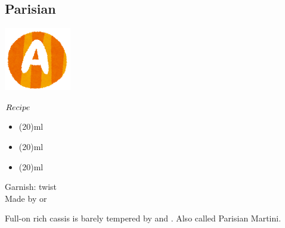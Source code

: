 \subsection{Parisian}
\vspace{-7mm}
\hspace{28mm}
\includegraphics[scale=.12]{capital_a.png}
\vspace{2.5mm}
\begin{itembox}[l]{\boldmath $Recipe$}
\begin{itemize}
\setlength{\parskip}{0cm}
\setlength{\itemsep}{0cm}
\item {}(20)ml
\item {}(20)ml
\item {}(20)ml
\end{itemize}
\vspace{-4mm}
Garnish: \lemon twist\\
Made by \shake or \stir
\end{itembox}
Full-on rich cassis is barely tempered by \gin and \vermouth
\hspace{-1mm}.
Also called Parisian Martini.
